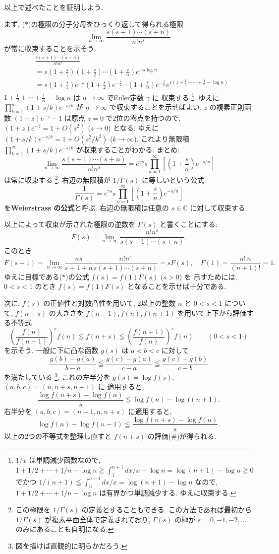 \documentclass[12pt,twoside]{jarticle}
\newcommand\C{{\mathbb C}} %
\theoremstyle{jplain}
\theoremstyle{jplain}
\theoremstyle{jplain}
\numberwithin{theorem}{section}
\numberwithin{equation}{section}
\numberwithin{figure}{section}
\numberwithin{table}{section}
\begin{document}
以上で述べたことを証明しよう.

まず, ($*$)の極限の分子分母をひっくり返して得られる極限
\[
\lim_{n\to\infty}\frac{s(s+1)\cdots(s+n)}{n!n^s}
\]
が常に収束することを示そう.
\begin{align*}
&
\frac{s(s+1)\cdots(s+n)}{n!n^s}
\\ &
=
s\left(1+\frac{s}{1}\right)\left(1+\frac{s}{2}\right)\cdots\left(1+\frac{s}{n}\right)
e^{-s\log n}
\\ &
=
s\left(1+\frac{s}{1}\right)e^{-s}\left(1+\frac{s}{2}\right)e^{-\frac{s}{2}}
 \cdots\left(1+\frac{s}{n}\right)e^{-\frac{s}{n}}
e^{s\left(1+\frac{1}{2}+\cdots+\frac{1}{n}-\log n\right)}
\end{align*}
$1+\frac{1}{2}+\cdots+\frac{1}{n}-\log n$ は $n\to\infty$ でEuler定数 $\gamma$ に
収束する%
\footnote{$1/x$ は単調減少函数なので,
$1+1/2+\cdots+1/n-\log n\geqq\int_1^{n+1}dx/x-\log n=\log(n+1)-\log n\geqq 0$
でかつ $1/(n+1)\leqq\int_n^{n+1}dx/x=\log(n+1)-\log n$ なので,
$1+1/2+\cdots+1/n-\log n$ は有界かつ単調減少する. ゆえに収束する.}.
ゆえに $\prod_{k=1}^n(1+s/k)e^{-s/k}$ が $n\to\infty$ で収束することを示せばよい.
$z$ の複素正則函数 $(1+z)e^{-z}-1$ は原点 $z=0$ で2位の零点を持つので,
$(1+z)e^{-z}=1+O(z^2)$ ($z\to 0$) となる.
ゆえに $(1+s/k)e^{-s/k}=1+O(s^2/k^2)$ ($k\to\infty$).
これより無限積 $\prod_{k=1}^\infty(1+s/k)e^{-s/k}$ が収束することがわかる.
まとめ:
\[
\lim_{n\to\infty}\frac{s(s+1)\cdots(s+n)}{n!n^s}
=e^{\gamma s}s\prod_{n=1}^\infty\left[ \left(1+\frac{s}{n}\right)e^{-s/n} \right]
\]
は常に収束する%
\footnote{この極限を $1/\Gamma(s)$ の定義とすることもできる.
この方法であれば最初から $1/\Gamma(s)$ が複素平面全体で定義されており,
$\Gamma(s)$ の極が $s=0,-1,-2,\ldots$ のみにあることも自明になる.}.
右辺の無限積が $1/\Gamma(s)$ に等しいという公式
\[
\frac{1}{\Gamma(s)}
=e^{\gamma s}s\prod_{n=1}^\infty\left[ \left(1+\frac{s}{n}\right)e^{-s/n} \right]
\]
を{\bfseries Weierstrass の公式}と呼ぶ.
右辺の無限積は任意の $s\in\C$ に対して収束する.

以上によって収束が示された極限の逆数を $F(s)$ と書くことにする:
\[
F(s)=\lim_{n\to\infty}\frac{n!n^s}{s(s+1)\cdots(s+n)}.
\]
このとき
\[
F(s+1)
=\lim_{n\to\infty}
\frac{ns}{s+1+n}\frac{n!n^s}{s(s+1)\cdots(s+n)}
=sF(s), \quad
F(1)=\frac{n!\,n}{(n+1)!}=1.
\]
ゆえに目標である($*$)の公式 $f(s)=f(1)F(s)$ ($s>0$) を
示すためには, $0<s<1$ のとき $f(s)=f(1)F(s)$ となることを示せば十分である.

次に, $f(s)$ の正値性と対数凸性を用いて,
2以上の整数 $n$ と $0<s<1$ について,
$f(n+s)$ の大きさを $f(n-1),f(n),f(n+1)$ を用いて上下から評価する不等式
\[
\left(\frac{f(n)}{f(n-1)}\right)^s f(n)
\leqq f(n+s)
\leqq \left(\frac{f(n+1)}{f(n)}\right)^s f(n)
\qquad(0<s<1)
\tag{$\#$}
\]
を示そう. 一般に下に凸な函数 $g(s)$ は $a<b<c$ に対して
\[
\frac{g(b)-g(a)}{b-a}
\leqq \frac{g(c)-g(a)}{c-a}
\leqq \frac{g(c)-g(b)}{c-b}
\]
を満たしている
\footnote{図を描けば直観的に明らかだろう.}.
これの左半分を $g(s)=\log f(s)$, $(a,b,c)=(n,n+s,n+1)$ に
適用すると,
\[
\frac{\log f(n+s)-\log f(n)}{s}\leqq \log f(n)-\log f(n+1).
\]
右半分を $(a,b,c)=(n-1,n,n+s)$ に適用すると,
\[
\log f(n)-\log f(n-1)\leqq\frac{\log f(n+s)-\log f(n)}{s}.
\]
以上の2つの不等式を整理し直すと $f(n+s)$ の評価($\#$)が得られる.
\end{document}
